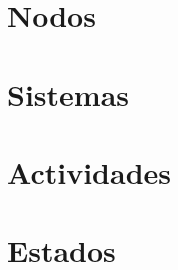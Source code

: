 \newpage

\section{Nodos}

\newpage

\section{Sistemas}

\newpage

\section{Actividades}

\newpage

\section{Estados}

\newpage






